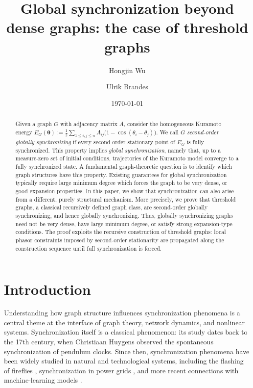 \documentclass[11pt,reqno]{amsart}
\title[Threshold Graphs are Globally Synchronizing]{Global synchronization beyond dense graphs: the case of threshold graphs}
\author[Wu]{Hongjin Wu}
\author[Brandes]{Ulrik Brandes}
\date{\today}
\theoremstyle{definition}
\begin{document}
\begin{abstract}
Given a graph \(G\) with adjacency matrix \(A\), consider the homogeneous Kuramoto energy $E_G(\boldsymbol{\theta})
:=
\frac{1}{2}
\sum_{1\leq i,j\leq n}
A_{ij}\bigl(1-\cos(\theta_i-\theta_j)\bigr)$.
We call \(G\) \emph{second-order globally synchronizing} if every second-order stationary point of \(E_G\) is fully synchronized. This property implies \emph{global synchronization}, namely that, up to a measure-zero set of initial conditions, trajectories of the Kuramoto model converge to a fully synchronized state.
A fundamental graph-theoretic question is to identify which graph structures have this property. Existing guarantees for global synchronization typically require large minimum degree which forces the graph to be very dense, or good expansion properties. In this paper, we show that synchronization can also arise from a different, purely structural mechanism. More precisely, we prove that threshold graphs, a classical recursively defined graph class, are second-order globally synchronizing, and hence globally synchronizing. Thus, globally synchronizing graphs need not be very dense, have large minimum degree, or satisfy strong expansion-type conditions. The proof exploits the recursive construction of threshold graphs: local phasor constraints imposed by second-order stationarity are propagated along the construction sequence until full synchronization is forced.
\end{abstract}

\maketitle
\tableofcontents
\section{Introduction}\label{sec:intro}
Understanding how graph structure influences synchronization phenomena is a central theme at the interface of graph theory, network dynamics, and nonlinear systems. Synchronization itself is a classical phenomenon: its study dates back to the 17th century, when Christiaan Huygens observed the spontaneous synchronization of pendulum clocks. Since then, synchronization phenomena have been widely studied in natural and technological systems, including the flashing of fireflies \cite{Buck1968, Strogatz1993}, synchronization in power grids \cite{dorfler2012synchronization}, and more recent connections with machine-learning models \cite{Miyato2024ArtificialKuramoto,Geshkovski2025,Criscitiello2024}.
\end{document}
